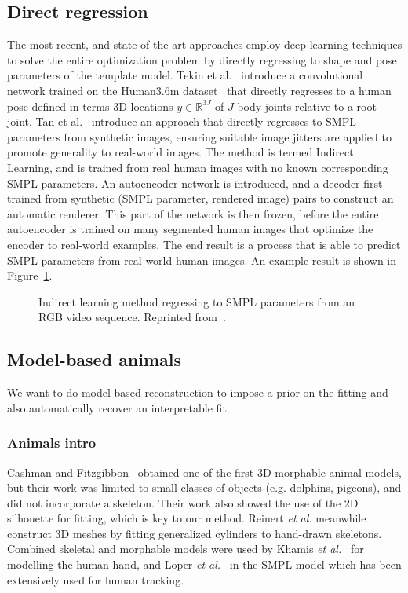 \subsection{Direct regression}
The most recent, and state-of-the-art approaches employ deep learning techniques to solve the entire optimization problem by directly regressing to shape and pose parameters of the template model. Tekin et al.~\cite{tekin2016direct} introduce a convolutional network trained on the Human3.6m dataset~\cite{lin2014microsoft} that directly regresses to a human pose defined in terms 3D locations $y \in \mathbb{R}^{3J}$ of $J$ body joints relative to a root joint. Tan et al.~\cite{tan17indirect} introduce an approach that directly regresses to SMPL parameters from synthetic images, ensuring suitable image jitters are applied to promote generality to real-world images. The method is termed Indirect Learning, and is trained from real human images with no known corresponding SMPL parameters. An autoencoder network is introduced, and a decoder first trained from synthetic (SMPL parameter, rendered image) pairs to construct an automatic renderer. This part of the network is then frozen, before the entire autoencoder is trained on many segmented human images that optimize the encoder to real-world examples. The end result is a process that is able to predict SMPL parameters from real-world human images. An example result is shown in Figure~\ref{fig:indirect_learning}.

\begin{figure}[H] %
    \caption{Indirect learning method regressing to SMPL parameters from an RGB video sequence. Reprinted from~\cite{tan17indirect}.}
    \label{fig:indirect_learning}
\end{figure}


\subsection{Model-based animals}

We want to do model based reconstruction to impose a prior on the fitting and also automatically recover an interpretable fit.

\subsubsection{Animals intro}

Cashman and Fitzgibbon~\cite{cashman2013shape} obtained one of the first 3D morphable animal models, but their work was limited to small classes of objects (e.g. dolphins, pigeons), and did not incorporate a skeleton.  Their work also showed the use of the 2D silhouette for fitting, which is key to our method. 
Reinert {\em et al.} \cite{reinert2016animated} meanwhile construct 3D meshes by fitting generalized cylinders to hand-drawn skeletons.
Combined skeletal and morphable models were used by Khamis {\em et al.}~\cite{hand-shape} for modelling the human hand, and Loper {\em et al.}~\cite{loper15smpl} in the SMPL model which has been extensively used for human tracking. 

